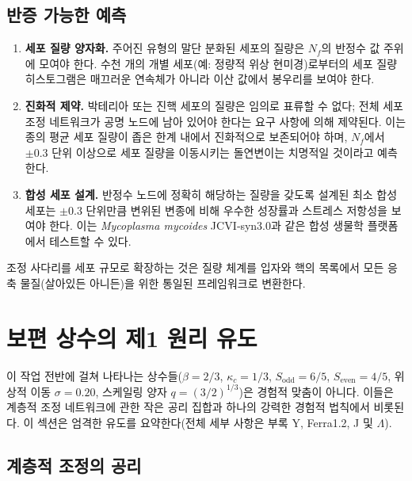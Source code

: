 \documentclass[11pt,a4paper]{article}
\begin{document}
	\subsection{반증 가능한 예측}
	\begin{enumerate}
		\item \textbf{세포 질량 양자화.} 주어진 유형의 말단 분화된 세포의 질량은 \(N_f\)의 반정수 값 주위에 모여야 한다. 수천 개의 개별 세포(예: 정량적 위상 현미경)로부터의 세포 질량 히스토그램은 매끄러운 연속체가 아니라 이산 값에서 봉우리를 보여야 한다.
		\item \textbf{진화적 제약.} 박테리아 또는 진핵 세포의 질량은 임의로 표류할 수 없다; 전체 세포 조정 네트워크가 공명 노드에 남아 있어야 한다는 요구 사항에 의해 제약된다. 이는 종의 평균 세포 질량이 좁은 한계 내에서 진화적으로 보존되어야 하며, \(N_f\)에서 \(\pm 0.3\) 단위 이상으로 세포 질량을 이동시키는 돌연변이는 치명적일 것이라고 예측한다.
		\item \textbf{합성 세포 설계.} 반정수 노드에 정확히 해당하는 질량을 갖도록 설계된 최소 합성 세포는 \(\pm 0.3\) 단위만큼 변위된 변종에 비해 우수한 성장률과 스트레스 저항성을 보여야 한다. 이는 \textit{Mycoplasma mycoides} JCVI‑syn3.0과 같은 합성 생물학 플랫폼에서 테스트할 수 있다.
	\end{enumerate}
	
	조정 사다리를 세포 규모로 확장하는 것은 질량 체계를 입자와 핵의 목록에서 모든 응축 물질(살아있든 아니든)을 위한 통일된 프레임워크로 변환한다.
	
	\section{보편 상수의 제1 원리 유도}
	\label{sec:first-principles}
	
	이 작업 전반에 걸쳐 나타나는 상수들(\(\beta = 2/3\), \(\kappa_c = 1/3\), \(S_{\mathrm{odd}}=6/5\), \(S_{\mathrm{even}}=4/5\), 위상적 이동 \(\sigma = 0.20\), 스케일링 양자 \(q = (3/2)^{1/3}\))은 경험적 맞춤이 아니다. 이들은 계층적 조정 네트워크에 관한 작은 공리 집합과 하나의 강력한 경험적 법칙에서 비롯된다. 이 섹션은 엄격한 유도를 요약한다(전체 세부 사항은 부록 Y, Ferra1.2, J 및 \(\Lambda\)).
	
	\subsection{계층적 조정의 공리}
	
\end{document}
